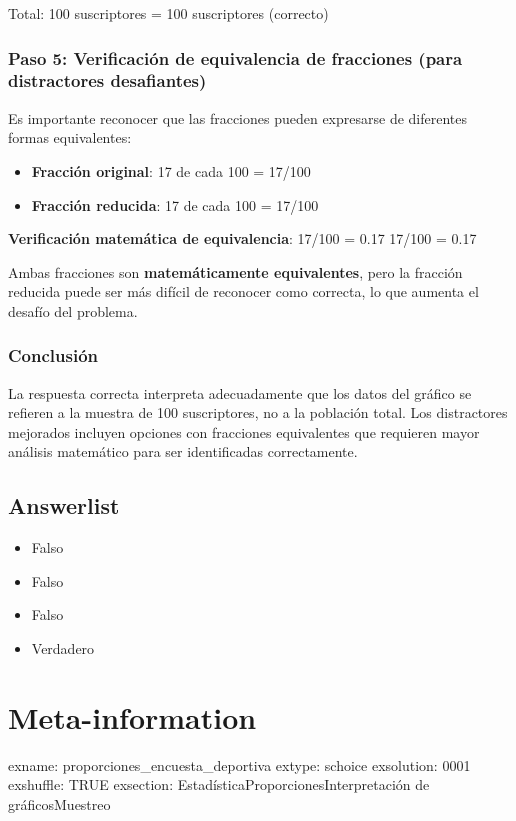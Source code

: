 \documentclass[
]{article}
\providecommand{\tightlist}{%
  \setlength{\itemsep}{0pt}\setlength{\parskip}{0pt}}
\begin{document}
Total: 100 suscriptores = 100 suscriptores (correcto)

\subsubsection{Paso 5: Verificación de equivalencia de fracciones (para
distractores
desafiantes)}\label{paso-5-verificaciuxf3n-de-equivalencia-de-fracciones-para-distractores-desafiantes}

Es importante reconocer que las fracciones pueden expresarse de
diferentes formas equivalentes:

\begin{itemize}
\tightlist
\item
  \textbf{Fracción original}: 17 de cada 100 = 17/100
\item
  \textbf{Fracción reducida}: 17 de cada 100 = 17/100
\end{itemize}

\textbf{Verificación matemática de equivalencia}: 17/100 = 0.17 17/100 =
0.17

Ambas fracciones son \textbf{matemáticamente equivalentes}, pero la
fracción reducida puede ser más difícil de reconocer como correcta, lo
que aumenta el desafío del problema.

\subsubsection{Conclusión}\label{conclusiuxf3n}

La respuesta correcta interpreta adecuadamente que los datos del gráfico
se refieren a la muestra de 100 suscriptores, no a la población total.
Los distractores mejorados incluyen opciones con fracciones equivalentes
que requieren mayor análisis matemático para ser identificadas
correctamente.

\subsection{Answerlist}\label{answerlist-1}

\begin{itemize}
\tightlist
\item
  Falso
\item
  Falso
\item
  Falso
\item
  Verdadero
\end{itemize}

\section{Meta-information}\label{meta-information}

exname: proporciones\_encuesta\_deportiva extype: schoice exsolution:
0001 exshuffle: TRUE exsection:
Estadística\textbar Proporciones\textbar Interpretación de
gráficos\textbar Muestreo
\end{document}
